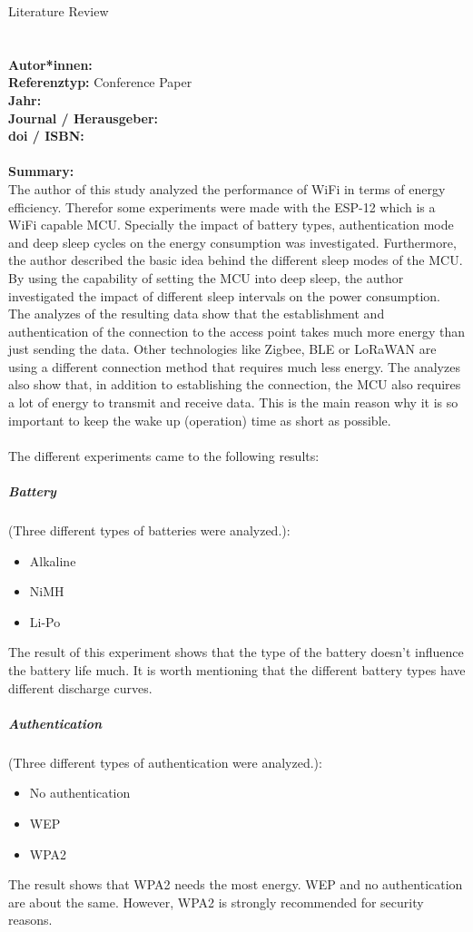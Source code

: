 \documentclass{report}
\newcommand{\createConferencePaperHeader}[1]{
    {\let\clearpage\relax \chapter{\citetitle{#1}}}
    \noindent
    \textbf{Autor*innen:} \citeauthor{#1} \\
    \textbf{Referenztyp:} Conference Paper\\
    \textbf{Jahr:} \citeyear{#1} \\
    \textbf{Journal / Herausgeber:} \citelist{#1}{publisher}\\
    \textbf{doi / ISBN:} \citefield{#1}{doi} \\\\
    \textbf{Summary:}\\
}
\begin{document}
{\LARGE Literature Review}


\createConferencePaperHeader{montori_is_2017}
The author of this study analyzed the performance of WiFi in terms of energy efficiency.
Therefor some experiments were made with the ESP-12 which is a WiFi capable MCU.
Specially the impact of battery types, authentication mode and deep sleep cycles on the energy consumption was investigated.
Furthermore, the author described the basic idea behind the different sleep modes of the MCU.
By using the capability of setting the MCU into deep sleep, the author investigated the impact of different
sleep intervals on the power consumption. 
The analyzes of the resulting data show that the establishment and authentication of the connection to the access point takes much more
energy than just sending the data. Other technologies like Zigbee, BLE or LoRaWAN are using a different connection method that requires much less energy.
The analyzes also show that, in addition to establishing the connection, the MCU also requires a lot of energy to transmit and receive data.
This is the main reason why it is so important to keep the wake up (operation) time as short as possible.
\\
\\
The different experiments came to the following results:\\
\paragraph{Battery} (Three different types of batteries were analyzed.):
\begin{itemize}
    \item Alkaline
    \item NiMH
    \item Li-Po
\end{itemize}
The result of this experiment shows that the type of the battery doesn't influence the battery life much.
It is worth mentioning that the different battery types have different discharge curves.

\paragraph{Authentication} (Three different types of authentication were analyzed.):
\begin{itemize}
    \item No authentication
    \item WEP
    \item WPA2
\end{itemize}
The result shows that WPA2 needs the most energy. WEP and no authentication are about the same.
However, WPA2 is strongly recommended for security reasons.
\end{document}
